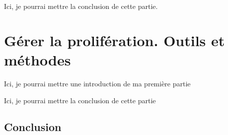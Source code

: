 \documentclass[12pt,twoside]{book}
\begin{document}
	
	
	
	
	
	
	Ici, je pourrai mettre la conclusion  de cette partie.
	
	
	\part{Gérer la prolifération. Outils et méthodes}
	
	
	
	Ici, je pourrai mettre une introduction de ma première partie
	
	
	
	
	
	
	
	Ici, je pourrai mettre la conclusion de cette partie
	
	
	\chapter*{Conclusion}
	\newpage{\pagestyle{empty}\cleardoublepage}
	
	
	
	
	
	
	
	
	
\end{document}
